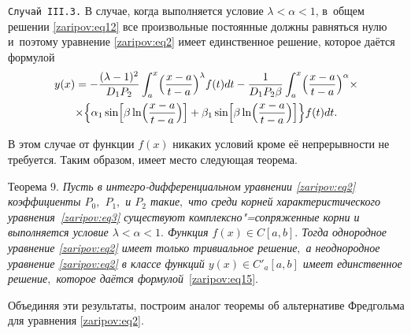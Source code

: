 {\smallskip

\texttt{Случай III.3.}  
В случае, когда выполняется условие $\lambda<\alpha<1$, в~общем решении \eqref{zaripov:eq12} все произвольные постоянные должны равняться нулю и~поэтому уравнение \eqref{zaripov:eq2} имеет единственное решение, которое даётся формулой
\begin{multline}
y(x)=-\frac{(\lambda-1)^2}{D_1P_2}\int _{a}^{x}
\Bigl(\frac{x-a}{t-a}\Bigr)^\lambda f(t)dt-
\frac{1}{D_1P_2\beta}\int _{a}^{x}
\Bigl(\frac{x-a}{t-a}\Bigr)^\alpha\times\\
\times
\Bigl\{\alpha_1\sin\Bigl[\beta\ln\Bigl(\frac{x-a}{t-a}\Bigr)\Bigr]+
\beta_1\sin
\Bigl[\beta\ln\Bigl(\frac{x-a}{t-a}\Bigr)\Bigr]\Bigr\}f(t)dt.
\label{zaripov:eq15}
\end{multline}

В этом случае от функции $f(x)$  никаких условий кроме её непрерывности не требуется.
Таким образом, имеет место следующая теорема.

\smallskip

{\small\sc Теорема 9.} {\it Пусть в интегро-дифференциальном уравнении \eqref{zaripov:eq2} коэффициенты $P_0,$ $ P_1,$  и $P_2$  такие$,$ что среди корней характеристического уравнения~\eqref{zaripov:eq3} существуют комплексно"=сопряженные корни и выполняется условие $\lambda<\alpha<1.$ 
Функция $f(x)\in C[a,b].$
 Тогда однородное уравнение \eqref{zaripov:eq2} имеет только тривиальное решение$,$ а неоднородное уравнение \eqref{zaripov:eq2} в классе функций $y(x)\in C'_a[a,b]$ имеет единственное решение$,$ которое даётся формулой}~\eqref{zaripov:eq15}.


\smallskip

Объединяя эти результаты, построим аналог теоремы об альтернативе Фредгольма для уравнения \eqref{zaripov:eq2}.

\smallskip

}
